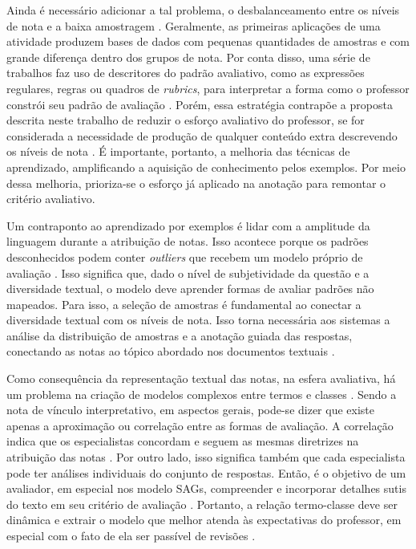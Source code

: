 Ainda é necessário adicionar a tal problema, o desbalanceamento entre os níveis de nota e a baixa amostragem \cite{dzikovska2012, lui2022}. Geralmente, as primeiras aplicações de uma atividade produzem bases de dados com pequenas quantidades de amostras e com grande diferença dentro dos grupos de nota. Por conta disso, uma série de trabalhos faz uso de descritores do padrão avaliativo, como as expressões regulares, regras ou quadros de \textit{rubrics}, para interpretar a forma como o professor constrói seu padrão de avaliação \cite{butcher2010, mohler2011, ramachandran2015a, condor2021}. Porém, essa estratégia contrapõe a proposta descrita neste trabalho de reduzir o esforço avaliativo do professor, se for considerada a necessidade de produção de qualquer conteúdo extra descrevendo os níveis de nota \cite{zesch2015, horbach2018}. É importante, portanto, a melhoria das técnicas de aprendizado, amplificando a aquisição de conhecimento pelos exemplos. Por meio dessa melhoria, prioriza-se o esforço já aplicado na anotação para remontar o critério avaliativo.

Um contraponto ao aprendizado por exemplos é lidar com a amplitude da linguagem durante a atribuição de notas. Isso acontece porque os padrões desconhecidos podem conter \textit{outliers} que recebem um modelo próprio de avaliação \cite{filighera2020}. Isso significa que, dado o nível de subjetividade da questão e a diversidade textual, o modelo deve aprender formas de avaliar padrões não mapeados. Para isso, a seleção de amostras é fundamental ao conectar a diversidade textual com os níveis de nota. Isso torna necessária aos sistemas a análise da distribuição de amostras e a anotação guiada das respostas, conectando as notas ao tópico abordado nos documentos textuais \cite{marvaniya2018}.

Como consequência da representação textual das notas, na esfera avaliativa, há um problema na criação de modelos complexos entre termos e classes \cite{ramachandran2015a}. Sendo a nota de vínculo interpretativo, em aspectos gerais, pode-se dizer que existe apenas a aproximação ou correlação entre as formas de avaliação. A correlação indica que os especialistas concordam e seguem as mesmas diretrizes na atribuição das notas \cite{artstein2008}. Por outro lado, isso significa também que cada especialista pode ter análises individuais do conjunto de respostas. Então, é o objetivo de um avaliador, em especial nos modelo SAGs, compreender e incorporar detalhes sutis do texto em seu critério de avaliação \cite{horbach2018, condor2021}. Portanto, a relação termo-classe deve ser dinâmica e extrair o modelo que melhor atenda às expectativas do professor, em especial com o fato de ela ser passível de revisões \cite{spalenza2016a}.

